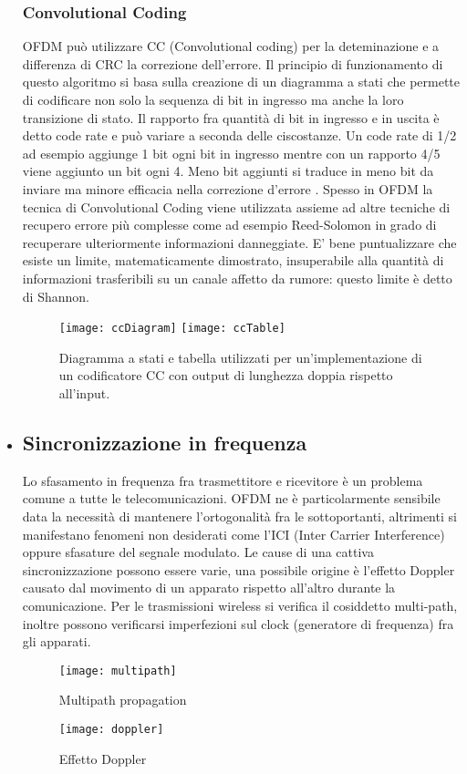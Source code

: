 \begin{itemize}
 \subsubsection{Convolutional Coding}OFDM può utilizzare CC (Convolutional coding) per la deteminazione e a differenza di CRC la correzione dell'errore. Il principio di funzionamento di questo algoritmo si basa sulla creazione di un diagramma a stati che permette di codificare non solo la sequenza di bit in ingresso ma anche la loro transizione di stato. Il rapporto fra quantità di bit in ingresso e in uscita è detto code rate e può variare a seconda delle ciscostanze. Un code rate di 1/2 ad esempio aggiunge 1 bit ogni bit in ingresso mentre con un rapporto 4/5 viene aggiunto un bit ogni 4. Meno bit aggiunti si traduce in meno bit da inviare ma minore efficacia nella correzione d'errore \cite{cc}.
 Spesso in OFDM la tecnica di Convolutional Coding viene utilizzata assieme ad altre tecniche di recupero errore più complesse come ad esempio Reed-Solomon in grado di recuperare ulteriormente informazioni danneggiate.
 E' bene puntualizzare che esiste un limite, matematicamente dimostrato, insuperabile alla quantità di informazioni trasferibili su un canale affetto da rumore: questo limite è detto di Shannon.
 \cite{ofdmWiki}
 \begin{figure}[h]
 	\centering
 	\texttt{[image: ccDiagram]}
 	\texttt{[image: ccTable]}
 	\caption{Diagramma a stati e tabella utilizzati per un'implementazione di un codificatore CC con output di lunghezza doppia rispetto all'input.}\label{fig:1}
 \end{figure}
\newpage
 \item \subsection{Sincronizzazione in frequenza}
 Lo sfasamento in frequenza fra trasmettitore e ricevitore è un problema comune a tutte le telecomunicazioni. OFDM ne è particolarmente sensibile data la necessità di mantenere l'ortogonalità fra le sottoportanti, altrimenti si manifestano fenomeni non desiderati come l'ICI (Inter Carrier Interference) oppure sfasature del segnale modulato.
 Le cause di una cattiva sincronizzazione possono essere varie, una possibile origine è l'effetto Doppler causato dal movimento di un apparato rispetto all'altro durante la comunicazione. Per le trasmissioni wireless si verifica il cosiddetto multi-path, inoltre possono verificarsi imperfezioni sul clock (generatore di frequenza) fra gli apparati.
 \begin{figure}[h]
 	\centering
 	\begin{minipage}[b]{.55\columnwidth}
 		\texttt{[image: multipath]}
 		\caption{Multipath propagation \cite{ofdm-simboli}}\label{fig:1}
 	\end{minipage}\hfill
 	\begin{minipage}[b]{.35\columnwidth}
 		\texttt{[image: doppler]}
 		\caption{Effetto Doppler \cite{doppler}}\label{fig:1}
 	\end{minipage}\hfill
 \end{figure}
 

\end{itemize}
